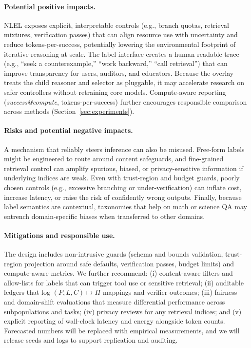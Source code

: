 \documentclass{article}
\theoremstyle{plain}
\theoremstyle{definition}
\theoremstyle{remark}
\begin{document}
\paragraph{Potential positive impacts.}
NLEL exposes explicit, interpretable controls (e.g., branch quotas,
retrieval mixtures, verification passes) that can align resource use with
uncertainty and reduce tokens-per-success, potentially lowering the
environmental footprint of iterative reasoning at scale. The label interface
creates a human-readable trace (e.g., ``seek a counterexample,'' ``work
backward,'' ``call retrieval'') that can improve transparency for users,
auditors, and educators. Because the overlay treats the child reasoner and
selector as pluggable, it may accelerate research on safer controllers
without retraining core models. Compute-aware reporting
(\emph{success@compute}, tokens-per-success) further encourages responsible
comparison across methods (Section~\ref{sec:experiments}).

\paragraph{Risks and potential negative impacts.}
A mechanism that reliably steers inference can also be misused. Free-form
labels might be engineered to route around content safeguards, and
fine-grained retrieval control can amplify spurious, biased, or
privacy-sensitive information if underlying indices are weak. Even with
trust-region and budget guards, poorly chosen controls (e.g., excessive
branching or under-verification) can inflate cost, increase latency, or
raise the risk of confidently wrong outputs. Finally, because label
semantics are contextual, taxonomies that help on math or science QA may
entrench domain-specific biases when transferred to other domains.

\paragraph{Mitigations and responsible use.}
The design includes non-intrusive guards (schema and bounds validation,
trust-region projection around safe defaults, verification passes, budget
limits) and compute-aware metrics. We further recommend: (i) content-aware
filters and allow-lists for labels that can trigger tool use or sensitive
retrieval; (ii) auditable ledgers that log $(P,L,C)\!\mapsto\!\Pi$ mappings
and verifier outcomes; (iii) fairness and domain-shift evaluations that
measure differential performance across subpopulations and tasks; (iv)
privacy reviews for any retrieval indices; and (v) explicit reporting of
wall-clock latency and energy alongside token counts. Forecasted numbers
will be replaced with empirical measurements, and we will release seeds and
logs to support replication and auditing.
\end{document}
